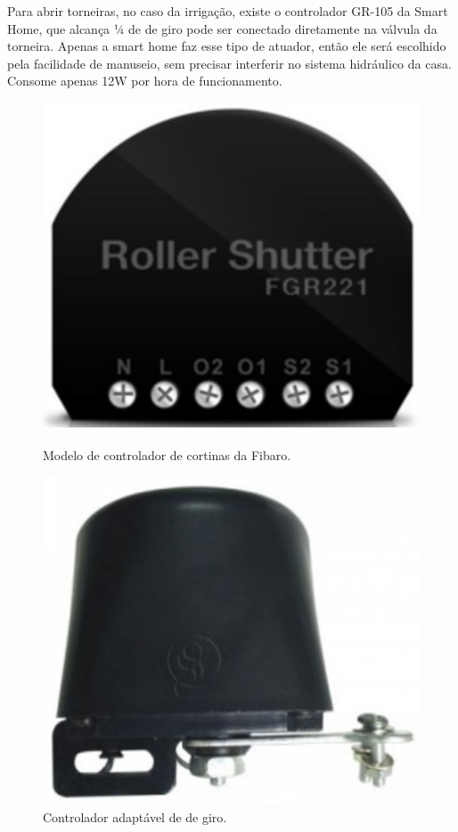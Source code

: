 	Para abrir torneiras, no caso da irrigação, existe o controlador GR-105 da Smart Home, que alcança ¼ de de giro pode ser conectado diretamente na válvula da torneira. Apenas a smart home faz esse tipo de atuador, então ele será escolhido pela facilidade de manuseio, sem precisar interferir no sistema hidráulico da casa. Consome apenas 12W por hora de funcionamento.

\begin{figure}[H]
\centering
\begin{minipage}{.45\textwidth}
	\centering
	\includegraphics[width=.7\linewidth,keepaspectratio,angle=0]{figuras/rollershutter.eps}
	\caption{Modelo de controlador de cortinas da Fibaro.}
\end{minipage}\hfill
\begin{minipage}{.45\textwidth}
	\centering
	\includegraphics[width=.7\linewidth,keepaspectratio,angle=0]{figuras/controlador_adaptavel.eps}
	\caption{Controlador adaptável de  de giro.}
\end{minipage}
\end{figure}

